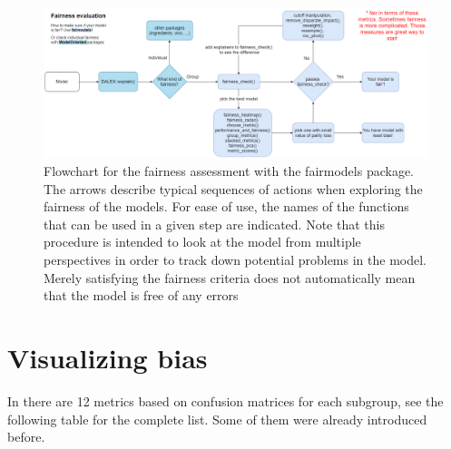 \begin{figure}

{\centering \includegraphics[width=1\linewidth]{flow} 

}

\caption[Flowchart for the fairness assessment with the fairmodels package]{Flowchart for the fairness assessment with the fairmodels package. The arrows describe typical sequences of actions when exploring the fairness of the models. For ease of use, the names of the functions that can be used in a given step are indicated. Note that this procedure is intended to look at the model from multiple perspectives in order to track down potential problems in the model. Merely satisfying the fairness criteria does not automatically mean that the model is free of any errors}\label{fig:flowchart}
\end{figure}

\hypertarget{visualization}{%
\section{Visualizing bias}\label{visualization}}

In  there are 12 metrics based on confusion matrices for
each subgroup, see the following table for the complete list. Some of
them were already introduced before.

